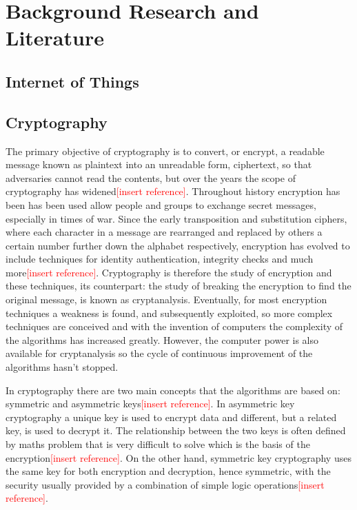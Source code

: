 \documentclass[12pt,twoside,a4paper]{report}
\begin{document}
    \chapter{Background Research and Literature}
    \label{chapter:research}
    
    \section{Internet of Things}
    \label{section:IoT}
    
    \section{Cryptography}
    The primary objective of cryptography is to convert, or encrypt, a readable message known as plaintext into an unreadable form, ciphertext, so that adversaries cannot read the contents,  but over the years the scope of cryptography has widened\textcolor{red}{[insert reference]}. Throughout history encryption has been has been used allow people and groups to exchange secret messages, especially in times of war. Since the early transposition and substitution ciphers, where each character in a message are rearranged and replaced by others a certain number further down the alphabet respectively, encryption has evolved to include techniques for identity authentication, integrity checks and much more\textcolor{red}{[insert reference]}. Cryptography is therefore the study of encryption and these techniques, its counterpart: the study of breaking the encryption to find the original message, is known as cryptanalysis. Eventually, for most encryption techniques a weakness is found, and subsequently exploited, so more complex techniques are conceived and with the invention of computers the complexity of the algorithms has increased greatly. However, the computer power is also available for cryptanalysis so the cycle of continuous improvement of the algorithms hasn't stopped.
    
    In cryptography there are two main concepts that the algorithms are based on: symmetric and asymmetric keys\textcolor{red}{[insert reference]}. In asymmetric key cryptography a unique key is used to encrypt data and different, but a related key, is used to decrypt it. The relationship between the two keys is often defined by maths problem that is very difficult to solve which is the basis of the encryption\textcolor{red}{[insert reference]}. On the other hand, symmetric key cryptography uses the same key for both encryption and decryption, hence symmetric, with the security usually provided by a combination of simple logic operations\textcolor{red}{[insert reference]}.
    
\end{document}
